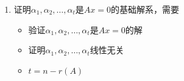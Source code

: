 \documentclass[./linear_algebra.tex]{subfiles}
\begin{document}
\begin{enumerate}
\begin{itemize}
\begin{circlenum}
\[\begin{tikzpicture}[baseline=(current bounding box.center)]
                        \draw[thick,black]
                        ([xshift=12pt,yshift=-12pt]mat.north west) --
                        ([xshift=-60pt,yshift=24pt]mat.south east);
                    \end{tikzpicture}
                \]
            \end{circlenum}
            \item \emph{e.g.}
            \[
                \left[
                    \begin{array}{ccc|c}
                        1 & -1              & a                & 2   \\
                        & \underline{a-1} & a+2              & -3  \\
                        &                 & \underline{2a+6} & a-9
                    \end{array}
                \right]
            \]
            从下向上依次检查与$0$的关系
            \begin{align*}
                & \text{唯一解} && \Leftrightarrow r(A) = r(\bar{A}) = n && \Leftrightarrow a \neq 1 \text{ 且 } a \neq -3 \\
                & \text{无穷解} && \Leftrightarrow r(A) = r(\bar{A}) < n && \Leftrightarrow a = 1 \\
                & \text{无解}   && \Leftrightarrow r(A) + 1 = r(\bar{A}) && \Leftrightarrow a = -3
            \end{align*}
        \end{itemize}
        \item 证明$\alpha_1,\alpha_2,\dots,\alpha_t$是$Ax = 0$的基础解系，需要
        \begin{itemize}
            \item 验证$\alpha_1,\alpha_2,\dots,\alpha_t$是$Ax = 0$的解
            \item 证明$\alpha_1,\alpha_2,\dots,\alpha_t$线性无关
            \item $t = n - r(A)$
        \end{itemize}
    \end{enumerate}
\end{document}
